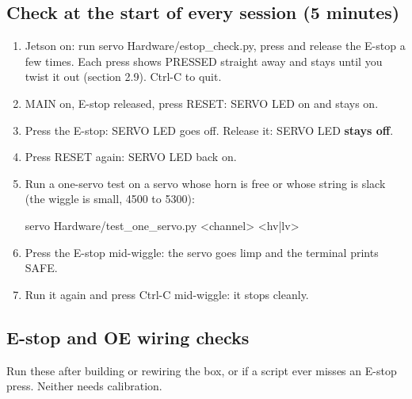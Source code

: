 \documentclass[11pt,letterpaper]{article}
\newcommand{\code}[1]{\textcolor{codeblue}{\ttfamily\smaller\relax #1}}
\begin{document}
\subsection{Check at the start of every session (5 minutes)}
\begin{enumerate}
  \item Jetson on: run \code{servo Hardware/\allowbreak{}estop\_\allowbreak{}check.py}, press and release the E-stop a few times. Each press shows PRESSED straight away and stays until you twist it out (section 2.9). Ctrl-C to quit.
  \item MAIN on, E-stop released, press RESET: SERVO LED on and stays on.
  \item Press the E-stop: SERVO LED goes off. Release it: SERVO LED \textbf{stays off}.
  \item Press RESET again: SERVO LED back on.
  \item Run a one-servo test on a servo whose horn is free or whose string is slack (the wiggle is small, 4500 to 5300):
\begin{codeblock}
servo Hardware/test_one_servo.py <channel> <hv|lv>
\end{codeblock}
  \item Press the E-stop mid-wiggle: the servo goes limp and the terminal prints SAFE.
  \item Run it again and press Ctrl-C mid-wiggle: it stops cleanly.
\end{enumerate}


\subsection{E-stop and OE wiring checks}
Run these after building or rewiring the box, or if a script ever misses an E-stop press. Neither needs calibration.
\end{document}

